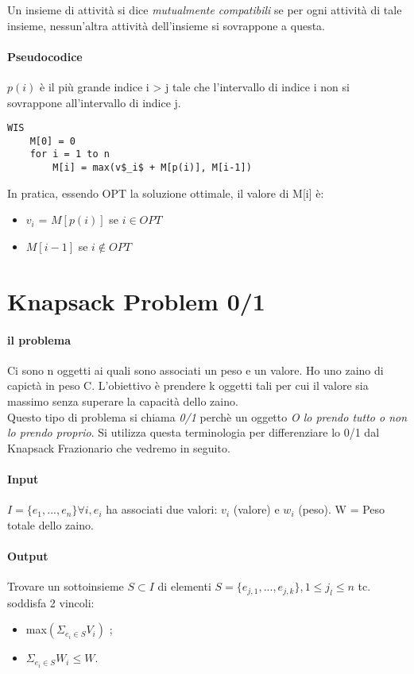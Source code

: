 Un insieme di attività si dice\emph{ mutualmente compatibili} se per ogni attività di tale insieme, nessun'altra attività dell'insieme si sovrappone a questa.


\paragraph{Pseudocodice}
$p(i)$ è il più grande indice i > j tale che l'intervallo di indice i non si sovrappone all'intervallo di indice j.
\begin{lstlisting}
WIS
	M[0] = 0
	for i = 1 to n
		M[i] = max(v$_i$ + M[p(i)], M[i-1])
\end{lstlisting}
In pratica, essendo OPT la soluzione ottimale, il valore di M[i] è:
\begin{itemize}
	\item $v_i$ = $M[p(i)]$ se $i \in OPT$
	\item $M[i-1]$ se $i \notin OPT$
\end{itemize}

\section{Knapsack Problem 0/1}
\paragraph{il problema} Ci sono n oggetti ai quali sono associati un peso e un valore. Ho uno zaino di capictà in peso C. L'obiettivo è prendere k oggetti tali per cui il valore sia massimo senza superare la capacità dello zaino.\\
Questo tipo di problema si chiama \emph{0/1} perchè un oggetto \emph{O lo prendo tutto o non lo prendo proprio}. Si utilizza questa terminologia per differenziare lo 0/1 dal Knapsack Frazionario che vedremo in seguito.
\paragraph{Input} $I = \{e_1,...,e_n\} \forall  i, e_i$ ha associati due valori: $v_i$ (valore) e $w_i$ (peso). W = Peso totale dello zaino.
\paragraph{Output} Trovare un sottoinsieme $ S \subset I $ di elementi $S = \{e_{j,1}, ..., e_{j,k}\} , 1 \leq j_l \leq n$ tc. soddisfa 2 vincoli:
\begin{itemize}
	\item max$(\Sigma_{e_i \in S}V_i)$ ;
	\item $\Sigma_{e_i \in S} W_i \leq W$.
\end{itemize}

